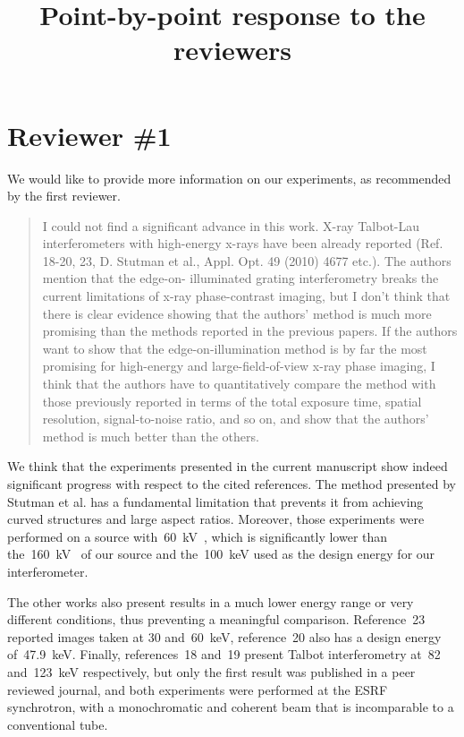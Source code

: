\documentclass[a4paper]{scrartcl}
\title{Point-by-point response to the reviewers}
\date{}
\begin{document}
\maketitle

\section*{Reviewer \#1}
We would like to provide more information on our experiments, as recommended
by the first reviewer.
\begin{quote}
    I could not find a significant advance in this work. X-ray Talbot-Lau interferometers with high-energy x-rays have been already reported (Ref. 18-20, 23, D. Stutman et al., Appl. Opt. 49 (2010) 4677 etc.). The authors mention that the edge-on- illuminated grating interferometry breaks the current limitations of x-ray phase-contrast imaging, but I don't think that there is clear evidence showing that the authors' method is much more promising than the methods reported in the previous papers. If the authors want to show that the edge-on-illumination method is by far the most promising for high-energy and large-field-of-view x-ray phase imaging, I think that the authors have to quantitatively compare the method with those previously reported in terms of the total exposure time, spatial resolution, signal-to-noise ratio, and so on, and show that the authors' method is much better than the others.
\end{quote}
We think that the experiments presented in the current manuscript show
indeed significant progress with respect to the cited references.
The method presented by Stutman et al. has a fundamental limitation that
prevents it from achieving curved structures and large aspect ratios.
Moreover, those experiments were performed on a source
with~\SI{60}{\kilo\volt\peak}, which is significantly lower than
the~\SI{160}{\kilo\volt\peak} of our source and the~\SI{100}{\kilo\eV} used
as the design energy for our interferometer.

The other works also present results in a much lower energy range or very
different conditions, thus preventing a meaningful comparison.
Reference~23 reported images taken at \num{30} and~\SI{60}{\kilo\eV},
reference~20 also has a design energy of~\SI{47.9}{\kilo\eV}. Finally,
references~18 and~19 present Talbot interferometry at~\num{82}
and~\SI{123}{\kilo\eV} respectively, but only the first result was published
in a peer reviewed journal, and both experiments were performed at the ESRF
synchrotron, with a monochromatic and coherent beam that is incomparable to
a conventional tube.
\end{document}
